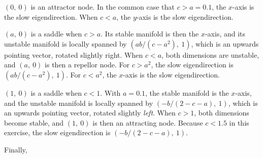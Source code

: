 $(0,\ 0)$ is an attractor node. In the common case that $c > a = 0.1$, the $x$-axis is the slow eigendirection. When $c < a$, the $y$-axis is the slow eigendirection.

$(a,\ 0)$ is a saddle when $c > a$. Its stable manifold is then the $x$-axis, and its unstable manifold is locally spanned by $(ab/(c-a^2),\ 1)$, which is an upwards pointing vector, rotated slightly right. When $c < a$, both dimensions are unstable, and $(a,\ 0)$ is then a repellor node. For $c > a^2$, the slow eigendirection is $(ab/(c-a^2),\ 1)$. For $c < a^2$, the $x$-axis is the slow eigendirection.

$(1,\ 0)$ is a saddle when $c < 1$. With $a = 0.1$, the stable manifold is the $x$-axis, and the unstable manifold is locally spanned by $(-b/(2-c-a),\ 1)$, which is an upwards pointing vector, rotated slightly \emph{left}. When $c > 1$, both dimensions become stable, and $(1,\ 0)$ is then an attracting node. Because $c < 1.5$ in this exercise, the slow eigendirection is $(-b/(2-c-a),\ 1)$.

Finally, 


\begin{figure}
\label{fig:eigenheart}
\end{figure}
